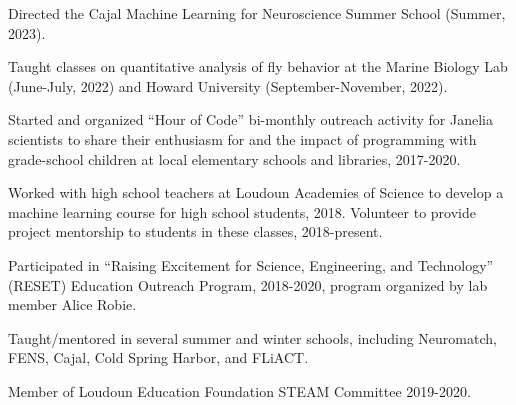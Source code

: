 \documentclass[11pt, letterpaper]{awesome-cv}
\begin{document}
\vspace{\acvSectionContentTopSkip}
\vspace{2mm}

\begin{cvitems}
\item Directed the Cajal Machine Learning for Neuroscience Summer School (Summer, 2023). 
\item Taught classes on quantitative analysis of fly behavior at the Marine Biology Lab (June-July, 2022) and Howard University (September-November, 2022). 
\item Started and organized ``Hour of Code'' bi-monthly outreach activity for Janelia scientists to share their enthusiasm for and the impact of programming with grade-school children at local elementary schools and libraries, 2017-2020.
\item Worked with high school teachers at Loudoun Academies of Science to develop a machine learning course for high school students, 2018. Volunteer to provide project mentorship to students in these classes, 2018-present.
\item Participated in ``Raising Excitement for Science, Engineering, and Technology'' (RESET) Education Outreach Program, 2018-2020, program organized by lab member Alice Robie. 
\item Taught/mentored in several summer and winter schools, including Neuromatch, FENS, Cajal, Cold Spring Harbor, and FLiACT. 
\item Member of Loudoun Education Foundation STEAM Committee 2019-2020.
\end{cvitems}
\vspace{\acvSectionContentTopSkip}


\vspace{\acvSectionContentTopSkip}
\end{document}
